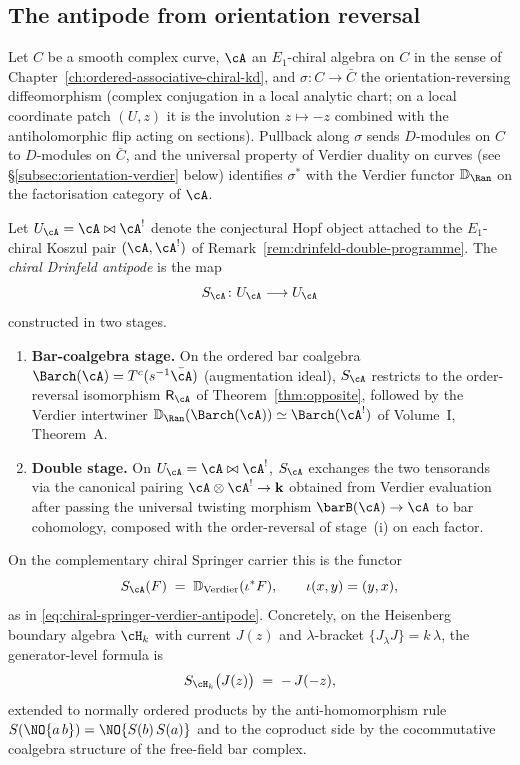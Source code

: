 \subsection{The antipode from orientation reversal}
\label{subsec:antipode-orientation-reversal}

Let $C$ be a smooth complex curve, $\cA$ an $E_1$-chiral algebra on
$C$ in the sense of Chapter~\ref{ch:ordered-associative-chiral-kd},
and $\sigma \colon C \to \bar{C}$ the orientation-reversing
diffeomorphism (complex conjugation in a local analytic chart; on a
local coordinate patch $(U, z)$ it is the involution $z \mapsto -z$
combined with the antiholomorphic flip acting on sections). Pullback
along $\sigma$ sends $D$-modules on $C$ to $D$-modules on $\bar{C}$,
and the universal property of Verdier duality on curves (see
\S\ref{subsec:orientation-verdier} below) identifies $\sigma^*$
with the Verdier functor $\mathbb{D}_{\Ran}$ on the factorisation
category of $\cA$.

\begin{definition}
\label{def:chiral-drinfeld-antipode}
Let $U_\cA = \cA \bowtie \cA^!$ denote the conjectural Hopf object
attached to the $E_1$-chiral Koszul pair $(\cA, \cA^!)$ of
Remark~\ref{rem:drinfeld-double-programme}. The
\emph{chiral Drinfeld antipode} is the map
\[
S_{\cA} \colon U_\cA \longrightarrow U_\cA
\]
constructed in two stages.
\begin{enumerate}
\item \textbf{Bar-coalgebra stage.} On the ordered bar coalgebra
$\Barch(\cA) = T^c(s^{-1}\bar\cA)$ (augmentation ideal),
$S_{\cA}$ restricts to the order-reversal isomorphism $\mathsf{R}_{\cA}$
of Theorem~\ref{thm:opposite}, followed by the Verdier intertwiner
$\mathbb{D}_{\Ran}(\Barch(\cA)) \simeq \Barch(\cA^!)$ of Volume~I,
Theorem~A.
\item \textbf{Double stage.} On $U_\cA = \cA \bowtie \cA^!$,
$S_{\cA}$ exchanges the two tensorands via the canonical pairing
$\cA \otimes \cA^! \to \mathbf{k}$ obtained from Verdier evaluation
after passing the universal twisting morphism
$\barB(\cA)\to\cA$ to bar cohomology, composed with the order-reversal
of stage~(i) on each factor.
\end{enumerate}
On the complementary chiral Springer carrier this is the functor
\[
S_{\cA}(F)
\;=\;
\mathbb{D}_{\mathrm{Verdier}}(\iota^*F),
\qquad
\iota(x,y)=(y,x),
\]
as in \eqref{eq:chiral-springer-verdier-antipode}.
Concretely, on the Heisenberg boundary algebra $\cH_k$ with current
$J(z)$ and $\lambda$-bracket $\{J_\lambda J\} = k\,\lambda$, the
generator-level formula is
\begin{equation}
\label{eq:antipode-heisenberg}
S_{\cH_k}\bigl(J(z)\bigr) \;=\; -\,J(-z),
\end{equation}
extended to normally ordered products by the anti-homomorphism rule
$S(\NO{a\,b}) = \NO{S(b)\,S(a)}$ and to the coproduct side by the
cocommutative coalgebra structure of the free-field bar complex.
\end{definition}

